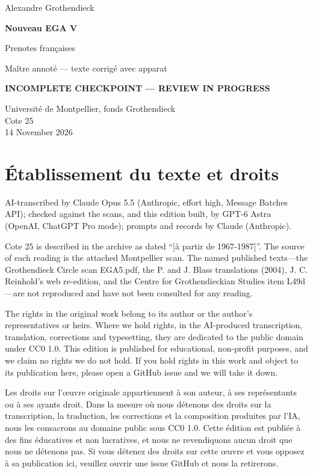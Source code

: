 \documentclass[10pt,a4paper]{article}
\newcommand{\EditionForm}{Maître annoté — texte corrigé avec apparat}
\begin{document}
\hypersetup{pageanchor=false}\begin{titlepage}\thispagestyle{empty}\vspace*{20mm}
{\Large Alexandre Grothendieck\par}\vspace{12mm}
{\Huge\bfseries Nouveau EGA V\par}\vspace{8mm}
{\Large Prenotes françaises\par}\vspace{7mm}
{\large\EditionForm\par}\vspace{12mm}
{\large\bfseries\color{deletedred}INCOMPLETE CHECKPOINT — REVIEW IN PROGRESS\par}\vspace{10mm}
Université de Montpellier, fonds Grothendieck\\ Cote 25\\
14 November 2026
\vfill\end{titlepage}\clearpage\hypersetup{pageanchor=true}
\section*{Établissement du texte et droits}
AI-transcribed by Claude Opus 5.5 (Anthropic, effort high, Message Batches API); checked against the scans, and this edition built, by GPT-6 Astra (OpenAI, ChatGPT Pro mode); prompts and records by Claude (Anthropic).

Cote 25 is described in the archive as dated ``[à partir de 1967-1987]''. The source of each reading is the attached Montpellier scan. The named published texts---the Grothendieck Circle scan EGA5.pdf, the P. and J. Blass translations (2004), J. C. Reinhold's web re-edition, and the Centre for Grothendieckian Studies item L49d---are not reproduced and have not been consulted for any reading.

The rights in the original work belong to its author or the author's representatives or heirs. Where we hold rights, in the AI-produced transcription, translation, corrections and typesetting, they are dedicated to the public domain under CC0 1.0. This edition is published for educational, non-profit purposes, and we claim no rights we do not hold. If you hold rights in this work and object to its publication here, please open a GitHub issue and we will take it down.

Les droits sur l'œuvre originale appartiennent à son auteur, à ses représentants ou à ses ayants droit. Dans la mesure où nous détenons des droits sur la transcription, la traduction, les corrections et la composition produites par l'IA, nous les consacrons au domaine public sous CC0 1.0. Cette édition est publiée à des fins éducatives et non lucratives, et nous ne revendiquons aucun droit que nous ne détenons pas. Si vous détenez des droits sur cette œuvre et vous opposez à sa publication ici, veuillez ouvrir une issue GitHub et nous la retirerons.
\end{document}

